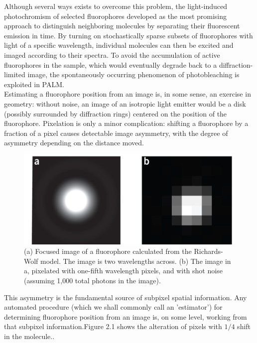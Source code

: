 \documentclass[paper=a4, fontsize=11pt]{scrartcl}
\numberwithin{equation}{section}		%
\numberwithin{figure}{section}			%
\numberwithin{table}{section}				%
\begin{document}
Although several ways exists to overcome this problem, the light-induced photochromism of selected fluorophores developed as the most promising approach to distinguish neighboring molecules by separating their fluorescent emission in time. By turning on stochastically sparse subsets of fluorophores with light of a specific wavelength, individual molecules can then be excited and imaged according to their spectra. To avoid the accumulation of active fluorophores in the sample, which would eventually degrade back to a diffraction-limited image, the spontaneously occurring phenomenon of photobleaching is exploited in PALM. \\

Estimating a fluorophore position from an image is, in some sense, an exercise in geometry: without noise, an image of an isotropic light emitter would be a disk (possibly surrounded by diffraction rings) centered on the position of the fluorophore. Pixelation is only a minor complication: shifting a fluorophore by a fraction of a pixel causes detectable image asymmetry, with the degree of asymmetry depending on the distance moved. 

\begin{figure}[h]
\centering
\includegraphics[width=.5\textwidth]{PSF_pixelated}
\caption{(a) Focused image of a fluorophore calculated from the Richards-Wolf model. The image is two wavelengths across. (b) The image in a, pixelated with one-fifth wavelength pixels, and with shot noise (assuming 1,000 total photons in the image). }
\end{figure}

This asymmetry is the fundamental source of subpixel spatial information. Any automated procedure (which we shall commonly call an 'estimator') for determining fluorophore position from an image is, on some level, working from that subpixel information.Figure 2.1 shows the alteration of pixels with $1 / 4$ shift in the molecule..\\ \\ \\ \\ \\ \\ \\ %
\end{document}
